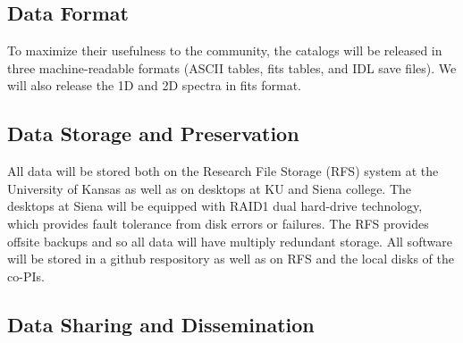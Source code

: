 \documentclass[11pt,preprint]{aastex}
\begin{document}



\subsection*{Data Format} 

To maximize their usefulness to the community, the catalogs will be
released in three machine-readable formats (ASCII tables, fits tables,
and IDL save files). We will also release the 1D and 2D spectra in
fits format.


\subsection*{Data Storage and Preservation}

All data will be stored both on the Research File Storage (RFS) system at the University of Kansas as well as on desktops at KU and Siena college.  The desktops at Siena will be equipped with RAID1 dual hard-drive technology, which provides fault tolerance from disk errors or failures.   The RFS provides offsite backups and so all data will have multiply redundant storage.  All software will be stored in a github respository as well as on RFS and the local disks of the co-PIs.


\subsection*{Data Sharing and Dissemination}
\end{document}

